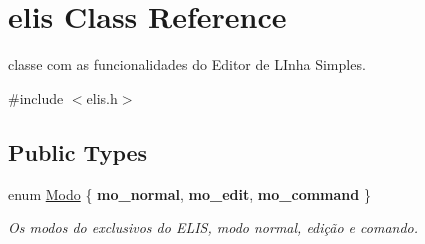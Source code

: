 \hypertarget{classelis}{}\section{elis Class Reference}
\label{classelis}


classe com as funcionalidades do Editor de L\+Inha Simples.  




{\ttfamily \#include $<$elis.\+h$>$}

\subsection*{Public Types}
\begin{DoxyCompactItemize}
\item 
\mbox{\label{classelis_a1d42edb1a12746c566712c4b4250769e}} 
enum \hyperlink{classelis_a1d42edb1a12746c566712c4b4250769e}{Modo} \{ {\bfseries mo\+\_\+normal}, 
{\bfseries mo\+\_\+edit}, 
{\bfseries mo\+\_\+command}
 \}\begin{DoxyCompactList}\small\item\em Os modos do exclusivos do E\+L\+IS, modo normal, edição e comando. \end{DoxyCompactList}
\end{DoxyCompactItemize}
